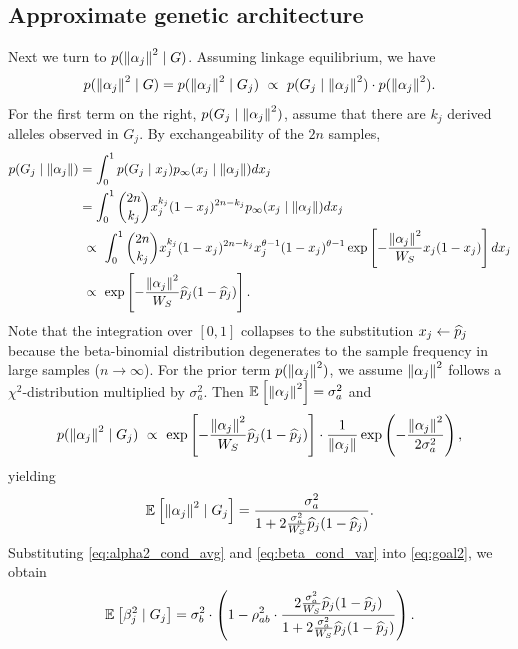 \documentclass[10pt]{article}
\begin{document}
\subsection{Approximate genetic architecture}
Next we turn to $p(\left\| \alpha_j \right\|^2 \mid G)$.
Assuming linkage equilibrium, we have
\begin{equation}
 \label{eq:bayes_for_alpha}
p(\norm{\alpha_j}^2 \mid G) = 
    p(\norm{\alpha_j}^2 \mid G_j)\ \propto\ 
        p(G_j \mid \norm{\alpha_j}^2) \cdot p(\norm{\alpha_j}^2).
\end{equation}
For the first term on the right, $p(G_j \mid \left\| \alpha_j \right\|^2)$, assume that
there are $k_j$ derived alleles observed in $G_j$. By exchangeability of the $2n$ samples,
\begin{align*}
    p(G_j \mid \norm{\alpha_j})    
    &=
    \int_0^1 
    p(G_j \mid x_j)
    p_{\infty}(x_j \mid \norm{\alpha_j})
    dx_j \\
    &=
    \int_0^1 
    \binom{2n}{k_j} 
    x_j^{k_j}(1-x_j)^{2n-k_j}
    \pinf(x_j \mid \norm{\alpha_j}) 
    dx_j \\
    & \ \propto \ \int_0^1   
    \binom{2n}{k_j} 
    x_j^{k_j}(1-x_j)^{2n-k_j}
    x_j^{\theta-1}(1-x_j)^{\theta-1}
    \exp\left[-\frac{\norm{\alpha_j}^2}{W_S}x_j(1-x_j) \right]dx_j \\
    &\ \propto \ \exp\left[-\frac{\norm{\alpha_j}^2}{W_S}\hp_j(1-\hp_j) \right].
\end{align*}
Note that the integration over $[0,1]$ collapses to the substitution $x_j \leftarrow \widehat{p}_j$ because the beta-binomial distribution degenerates to the sample frequency in large samples ($n \rightarrow \infty$).
For the prior term $p(\left\| \alpha_j \right\|^2)$, we assume $\left\| \alpha_j \right\|^2$ follows a $\chi^2$-distribution multiplied by $\sigma_a^2$.
Then $\mathbb{E}_{}\left[\left\| \alpha_j \right\|^2\right] = \sigma_a^2$ and
\begin{equation*}
    p(\norm{\alpha_j}^2 \mid G_j) \ \propto \ \exp\left[-\frac{\norm{\alpha_j}^2}{W_S}\hp_j(1-\hp_j) \right] \cdot
    \frac{1}{\norm{\alpha_j}}\exp\left(-\frac{\norm{\alpha_j}^2}{2\sigma_a^2}\right),
\end{equation*}
yielding
\begin{equation} \label{eq:alpha2_cond_avg}
    \mathbb{E}_{}\left[\left\| \alpha_j \right\|^2 \mid G_j\right] =
    \frac{\sigma_a^2}{
    1 + 2\frac{\sigma_a^2}{W_S}\widehat{p}_j(1-\widehat{p}_j)
    }.
\end{equation}
Substituting \eqref{eq:alpha2_cond_avg} and \eqref{eq:beta_cond_var} into \eqref{eq:goal2}, we obtain
\begin{equation} \label{eq:beta_cond_var}
    \mathbb{E}_{}\left[\beta_j^2 \mid G_j\right] = 
    \sigma_b^2 \cdot
    \left(
        1 - \rho_{ab}^2 \cdot 
        \frac{
        2 \frac{\sigma_a^2}{W_S}\widehat{p}_j(1-\widehat{p}_j) 
        }{
        1+ 2 \frac{\sigma_a^2}{W_S}\widehat{p}_j(1-\widehat{p}_j)
        }
    \right).
\end{equation}
\end{document}
